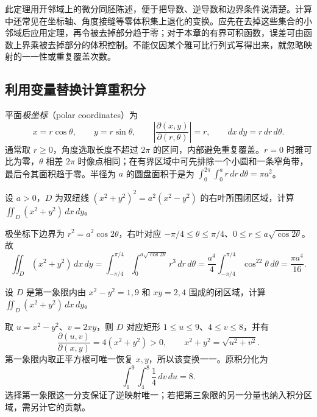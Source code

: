此定理用开邻域上的微分同胚陈述，便于把导数、逆导数和边界条件说清楚。计算中还常见在坐标轴、角度接缝等零体积集上退化的变换。应先在去掉这些集合的小邻域后应用定理，再令被去掉部分趋于零；对于本章的有界可积函数，误差可由函数上界乘被去掉部分的体积控制。不能仅因某个雅可比行列式写得出来，就忽略映射的一一性或重复覆盖次数。

\subsection{利用变量替换计算重积分}
\label{subsec:evaluating-multiple-integrals-by-change-of-variables}

平面\emph{极坐标}（polar coordinates）为
\begin{equation}
    x=r\cos\theta,\qquad y=r\sin\theta,\qquad
    \left|\frac{\partial(x,y)}{\partial(r,\theta)}\right|=r,
    \qquad dx\,dy=r\,dr\,d\theta.
    \label{eq:multiple-polar-coordinates}
\end{equation}
通常取 $r\geq0$，角度选取长度不超过 $2\pi$ 的区间，内部避免重复覆盖。$r=0$ 时雅可比为零，$\theta$ 相差 $2\pi$ 时像点相同；在有界区域中可先排除一个小圆和一条窄角带，最后令其面积趋于零。半径为 $a$ 的圆盘面积于是为 $\int_0^{2\pi}\int_0^ar\,dr\,d\theta=\pi a^2$。

\begin{example}
\label{ex:multiple-lemniscate-integral}
设 $a>0$，$D$ 为双纽线 $(x^2+y^2)^2=a^2(x^2-y^2)$ 的右叶所围闭区域，计算 $\iint_D(x^2+y^2)\,dx\,dy$。
\end{example}
\begin{solve}
极坐标下边界为 $r^2=a^2\cos2\theta$，右叶对应 $-\pi/4\leq\theta\leq\pi/4$、$0\leq r\leq a\sqrt{\cos2\theta}$。故
\[
    \iint_D(x^2+y^2)\,dx\,dy
    =\int_{-\pi/4}^{\pi/4}\int_0^{a\sqrt{\cos2\theta}}r^3\,dr\,d\theta
    =\frac{a^4}{4}\int_{-\pi/4}^{\pi/4}\cos^22\theta\,d\theta
    =\frac{\pi a^4}{16}.
\]
\end{solve}

\begin{example}
\label{ex:multiple-hyperbolic-substitution}
设 $D$ 是第一象限内由 $x^2-y^2=1,9$ 和 $xy=2,4$ 围成的闭区域，计算 $\iint_D(x^2+y^2)\,dx\,dy$。
\end{example}
\begin{solve}
取 $u=x^2-y^2$、$v=2xy$，则 $D$ 对应矩形 $1\leq u\leq9$、$4\leq v\leq8$，并有
\[
    \frac{\partial(u,v)}{\partial(x,y)}=4(x^2+y^2)>0,\qquad
    x^2+y^2=\sqrt{u^2+v^2}.
\]
第一象限内取正平方根可唯一恢复 $x,y$，所以该变换一一。原积分化为
\[
    \int_1^9\int_4^8\frac14\,dv\,du=8.
\]
选择第一象限这一分支保证了逆映射唯一；若把第三象限的另一分量也纳入积分区域，需另计它的贡献。
\end{solve}

